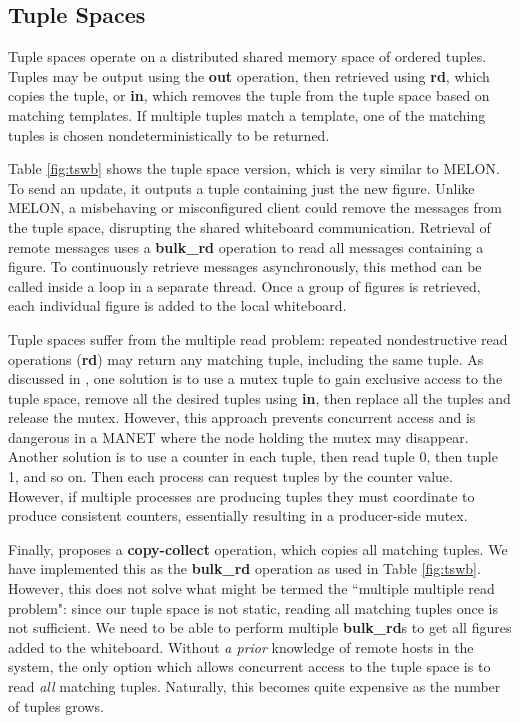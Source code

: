 \subsection{Tuple Spaces}

Tuple spaces operate on a distributed shared memory space of ordered tuples. Tuples may be output using the \textbf{out} operation, then retrieved using \textbf{rd}, which copies the tuple, or \textbf{in}, which removes the tuple from the tuple space based on matching templates. If multiple tuples match a template, one of the matching tuples is chosen nondeterministically to be returned.

Table \ref{fig:tswb} shows the tuple space version, which is very similar to MELON. To send an update, it outputs a tuple containing just the new figure. Unlike MELON, a misbehaving or misconfigured client could remove the messages from the tuple space, disrupting the shared whiteboard communication. Retrieval of remote messages uses a \textbf{bulk\_rd} operation to read all messages containing a figure. To continuously retrieve messages asynchronously, this method can be called inside a loop in a separate thread. Once a group of figures is retrieved, each individual figure is added to the local whiteboard.

Tuple spaces suffer from the multiple read problem\cite{mrdp}: repeated nondestructive read operations (\textbf{rd}) may return any matching tuple, including the same tuple. As discussed in \cite{mrdp}, one solution is to use a mutex tuple to gain exclusive access to the tuple space, remove all the desired tuples using \textbf{in}, then replace all the tuples and release the mutex. However, this approach prevents concurrent access and is dangerous in a MANET where the node holding the mutex may disappear. Another solution is to use a counter in each tuple, then read tuple 0, then tuple 1, and so on. Then each process can request tuples by the counter value. However, if multiple processes are producing tuples they must coordinate to produce consistent counters, essentially resulting in a producer-side mutex.

Finally, \cite{mrdp} proposes a \textbf{copy-collect} operation, which copies all matching tuples. We have implemented this as the \textbf{bulk\_rd} operation as used in Table \ref{fig:tswb}. However, this does not solve what might be termed the ``multiple multiple read problem": since our tuple space is not static, reading all matching tuples once is not sufficient. We need to be able to perform multiple \textbf{bulk\_rd}s to get all figures added to the whiteboard. Without \textit{a prior} knowledge of remote hosts in the system, the only option which allows concurrent access to the tuple space is to read \textit{all} matching tuples. Naturally, this becomes quite expensive as the number of tuples grows.

